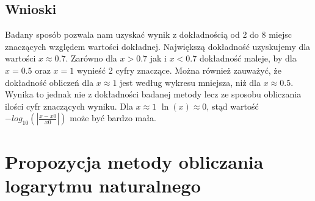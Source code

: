 \documentclass[10pt]{article}
\begin{document}
\subsection{Wnioski}
Badany sposób pozwala nam uzyskać wynik z dokładnością od 2 do 8 miejsc znaczących względem wartości dokładnej. Największą dokładność uzyskujemy dla wartości $x \approx 0.7$. Zarówno dla $x > 0.7$ jak i $x < 0.7$ dokładność maleje, by dla $x = 0.5$ oraz $x = 1$ wynieść 2 cyfry znaczące. Można również zauważyć, że dokładność obliczeń dla $x \approx 1$ jest według wykresu mniejsza, niż dla $x \approx 0.5$. Wynika to jednak nie z dokładności badanej metody lecz ze sposobu obliczania ilości cyfr znaczących wyniku. Dla $x \approx 1$ $\ln(x) \approx 0$, stąd wartość $-log_{10}(|\frac{x-x0}{x0}|)$ może być bardzo mała.\\ 


\section{Propozycja metody obliczania logarytmu naturalnego}
\end{document}
